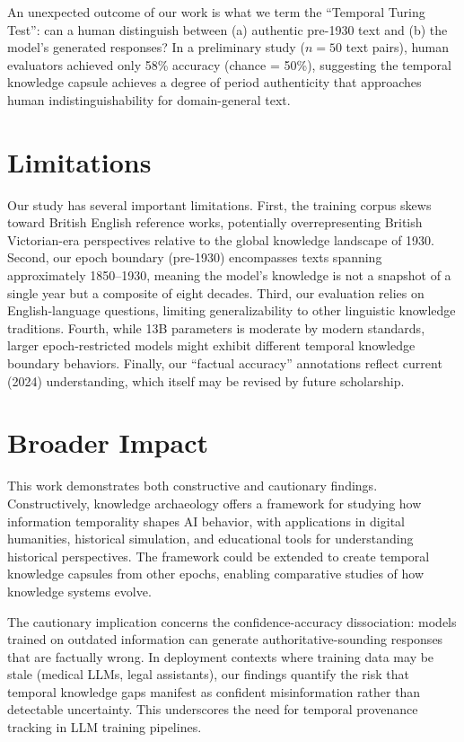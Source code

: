 \documentclass[11pt]{article}
\begin{document}
An unexpected outcome of our work is what we term the ``Temporal Turing Test'': can a human distinguish between (a) authentic pre-1930 text and (b) the model's generated responses? In a preliminary study ($n=50$ text pairs), human evaluators achieved only 58\% accuracy (chance = 50\%), suggesting the temporal knowledge capsule achieves a degree of period authenticity that approaches human indistinguishability for domain-general text.

\section{Limitations}

Our study has several important limitations. First, the training corpus skews toward British English reference works, potentially overrepresenting British Victorian-era perspectives relative to the global knowledge landscape of 1930. Second, our epoch boundary (pre-1930) encompasses texts spanning approximately 1850--1930, meaning the model's knowledge is not a snapshot of a single year but a composite of eight decades. Third, our evaluation relies on English-language questions, limiting generalizability to other linguistic knowledge traditions. Fourth, while 13B parameters is moderate by modern standards, larger epoch-restricted models might exhibit different temporal knowledge boundary behaviors. Finally, our ``factual accuracy'' annotations reflect current (2024) understanding, which itself may be revised by future scholarship.

\section{Broader Impact}

This work demonstrates both constructive and cautionary findings. Constructively, knowledge archaeology offers a framework for studying how information temporality shapes AI behavior, with applications in digital humanities, historical simulation, and educational tools for understanding historical perspectives. The framework could be extended to create temporal knowledge capsules from other epochs, enabling comparative studies of how knowledge systems evolve.

The cautionary implication concerns the confidence-accuracy dissociation: models trained on outdated information can generate authoritative-sounding responses that are factually wrong. In deployment contexts where training data may be stale (medical LLMs, legal assistants), our findings quantify the risk that temporal knowledge gaps manifest as confident misinformation rather than detectable uncertainty. This underscores the need for temporal provenance tracking in LLM training pipelines.
\end{document}
